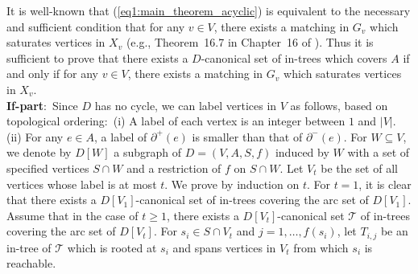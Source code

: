 \documentclass[11pt]{article}
\newcounter{ni}
\theoremstyle{plain}
\newcommand{\eop}{\hfill \usebox{\ProofSym}}
\newenvironment{proof}{\noindent {\it Proof.}}{\eop\par\vspace{0.3cm}}
\begin{document}
\begin{proof}
It is well-known that (\ref{eq1:main_theorem_acyclic}) is equivalent to the necessary and
 sufficient condition that for any $v \in V$, there exists a matching
 in $G_v$ which saturates vertices in $X_v$ (e.g., Theorem~16.7 in Chapter~16 of \cite{S03}). 
Thus it is
 sufficient to prove that there exists a $D$-canonical set of in-trees which
 covers $A$ if and only if for any $v \in V$, there exists a matching
 in $G_v$ which saturates vertices in $X_v$. \\
{\bf If-part$\colon$}
Since $D$ has no cycle, we can label vertices in $V$ as follows, based on 
topological ordering$\colon$ 
(i) A label of each vertex is an integer between $1$ and $|V|$.
(ii) For any $e\in A$, a label of $\partial^+(e)$ is smaller than that of $\partial^-(e)$.  
For $W\subseteq V$, we denote by $D[W]$ a subgraph of 
$D=(V,A,S,f)$ induced by $W$ with a set of 
specified vertices $S\cap W$ and a restriction of $f$ on $S\cap W$. 
Let $V_t$ be the set of all vertices whose label is at most
$t$. We prove by induction on $t$. For $t=1$, 
it is clear that there exists a $D[V_1]$-canonical 
set of in-trees covering the arc set of $D[V_1]$. 
Assume that in the case of $t\ge 1$, there exists a $D[V_t]$-canonical set $\mathcal{T}$ 
of in-trees covering the arc set of $D[V_t]$. 
For $s_i \in S\cap V_t$ and $j=1,\ldots,f(s_i)$, 
let $T_{i,j}$ be an in-tree of $\mathcal{T}$ 
which is rooted at $s_i$ and spans vertices in $V_t$ from which $s_i$ is reachable. 


\end{proof}
\end{document}
